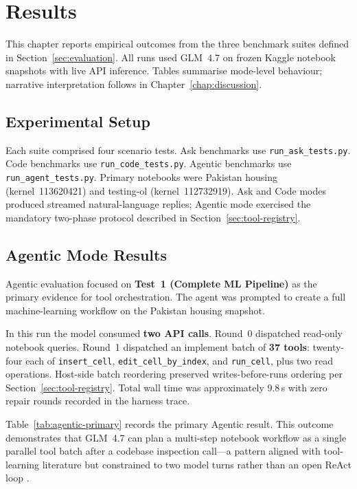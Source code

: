 \chapter{Results}
\label{c-results}

This chapter reports empirical outcomes from the three benchmark suites defined in Section~\ref{sec:evaluation}. All runs used GLM~4.7 on frozen Kaggle notebook snapshots with live \ac{API} inference. Tables summarise mode-level behaviour; narrative interpretation follows in Chapter~\ref{chap:discussion}.

\section{Experimental Setup}

Each suite comprised four scenario tests. Ask benchmarks use \texttt{run\_ask\_tests.py}. Code benchmarks use \texttt{run\_code\_tests.py}. Agentic benchmarks use \texttt{run\_agent\_tests.py}. Primary notebooks were Pakistan housing (kernel~113620421) and testing-ol (kernel~112732919). Ask and Code modes produced streamed natural-language replies; Agentic mode exercised the mandatory two-phase protocol described in Section~\ref{sec:tool-registry}.

\section{Agentic Mode Results}

Agentic evaluation focused on \textbf{Test~1 (Complete ML Pipeline)} as the primary evidence for tool orchestration. The agent was prompted to create a full machine-learning workflow on the Pakistan housing snapshot.

In this run the model consumed \textbf{two \ac{API} calls}. Round~0 dispatched read-only notebook queries. Round~1 dispatched an implement batch of \textbf{37 tools}: twenty-four each of \texttt{insert\_cell}, \texttt{edit\_cell\_by\_index}, and \texttt{run\_cell}, plus two read operations. Host-side batch reordering preserved writes-before-runs ordering per Section~\ref{sec:tool-registry}. Total wall time was approximately 9.8\,s with zero repair rounds recorded in the harness trace.

Table~\ref{tab:agentic-primary} records the primary Agentic result. This outcome demonstrates that GLM~4.7 can plan a multi-step notebook workflow as a single parallel tool batch after a codebase inspection call---a pattern aligned with tool-learning literature \parencite{schick2023toolformer,qin2024toolllm} but constrained to two model turns rather than an open ReAct loop \parencite{yao2023react}.

